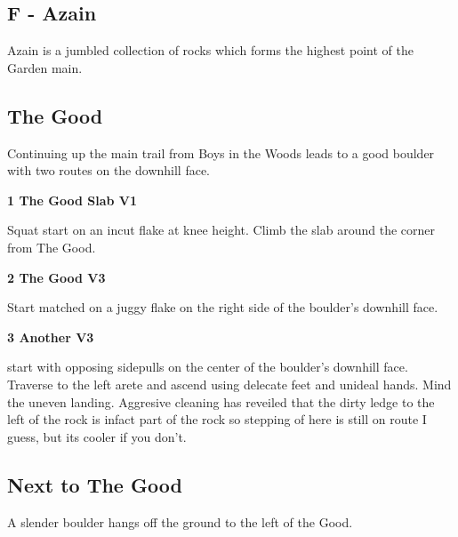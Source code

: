 \begin{multicols}{2}
		\section{F - Azain}\label{sa:Azain}
	Azain is a jumbled collection of rocks which forms the highest point of the Garden main.\\

	

			\subsection*{The Good}\label{bf:The Good}
			Continuing up the main trail from Boys in the Woods leads to a good boulder with two routes on the downhill face.\\
			
					\label{rt:The Good Slab}
\colorbox{green!20}{
\parbox{0.95\linewidth}{
\textbf{
1 The Good Slab V1    
}
}
}

					\begin{adjustwidth}{0.5cm}{}				
					Squat start on an incut flake at knee height. Climb the slab around the corner from The Good.
					\end{adjustwidth}
					\label{rt:The Good}
\colorbox{green!20}{
\parbox{0.95\linewidth}{
\textbf{
2 The Good V3    
}
}
}

					\begin{adjustwidth}{0.5cm}{}				
					Start matched on a juggy flake on the right side of the boulder's downhill face.
					\end{adjustwidth}
					\label{rt:Another}
\colorbox{green!20}{
\parbox{0.95\linewidth}{
\textbf{
3 Another V3   \warn 
}
}
}

					\begin{adjustwidth}{0.5cm}{}				
					start with opposing sidepulls on the center of the boulder's downhill face. Traverse to the left arete and ascend using delecate feet and unideal hands. Mind the uneven landing. Aggresive cleaning has reveiled that the dirty ledge to the left of the rock is infact part of the rock so stepping of here is still on route I guess, but its cooler if you don't.
					\end{adjustwidth}
			\subsection*{Next to The Good}\label{bf:Next to The Good}
			A slender boulder hangs off the ground to the left of the Good.\\
			

\end{multicols}
